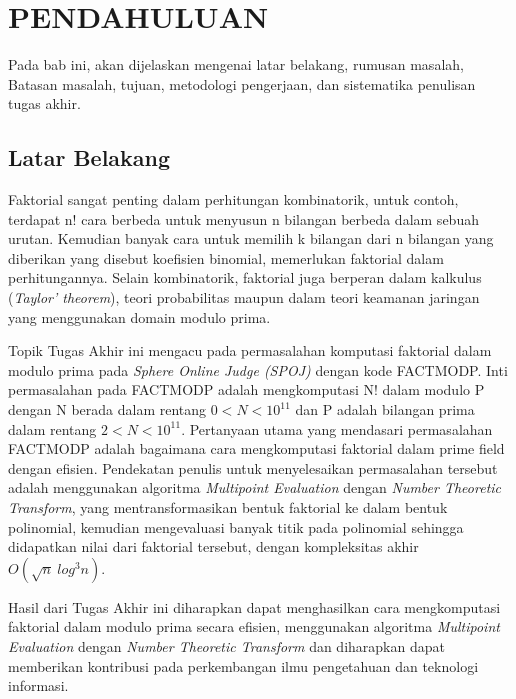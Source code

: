 \vspace{0ex}
\chapter {PENDAHULUAN}

Pada bab ini, akan dijelaskan mengenai latar belakang, rumusan masalah, Batasan masalah, tujuan, metodologi pengerjaan, dan sistematika penulisan tugas akhir.

\section{Latar Belakang}

\par Faktorial sangat penting dalam perhitungan kombinatorik, untuk contoh, terdapat n! cara berbeda untuk menyusun n bilangan berbeda dalam sebuah urutan. Kemudian banyak cara untuk memilih k bilangan dari n bilangan yang diberikan yang disebut koefisien binomial, memerlukan faktorial dalam perhitungannya. Selain kombinatorik, faktorial juga berperan dalam kalkulus (\textit{Taylor’ theorem}), teori probabilitas maupun dalam teori keamanan jaringan yang menggunakan domain modulo prima.

\par Topik Tugas Akhir ini mengacu pada permasalahan komputasi faktorial dalam modulo prima pada \textit{Sphere Online Judge (SPOJ)} dengan kode FACTMODP\cite{factmodp}. Inti permasalahan pada FACTMODP\cite{factmodp} adalah mengkomputasi N! dalam modulo P dengan N berada dalam rentang $ 0 < N < 10^{11} $ dan P adalah bilangan prima dalam rentang $ 2 < N < 10^{11} $. Pertanyaan utama yang mendasari permasalahan FACTMODP\cite{factmodp} adalah bagaimana cara mengkomputasi faktorial dalam prime field dengan efisien. Pendekatan penulis untuk menyelesaikan permasalahan tersebut adalah menggunakan algoritma \textit{Multipoint Evaluation} dengan \textit{Number Theoretic Transform}, yang mentransformasikan bentuk faktorial ke dalam bentuk polinomial, kemudian mengevaluasi banyak titik pada polinomial sehingga didapatkan nilai dari faktorial tersebut, dengan kompleksitas akhir $ O(\sqrt{n}\ log^3  n) $.

\par Hasil dari Tugas Akhir ini diharapkan dapat menghasilkan cara mengkomputasi faktorial dalam modulo prima secara efisien, menggunakan algoritma \textit{Multipoint Evaluation} dengan \textit{Number Theoretic Transform} dan diharapkan dapat memberikan kontribusi pada perkembangan ilmu pengetahuan dan teknologi informasi.

